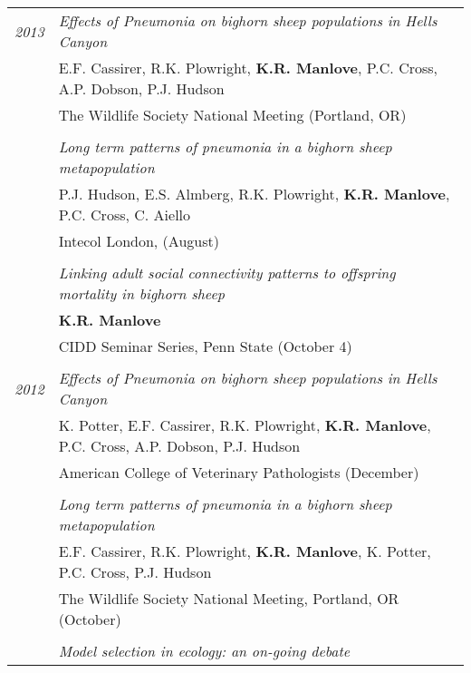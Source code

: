 \documentclass[9pt]{article}
\begin{document}
\vspace{.15in}

\begin{tabular}{p{.5cm} p{15cm}}
\hspace{-1.75cm} \footnotesize{\textit{2013}} & \hspace{-.5cm}\textit{Effects of Pneumonia on bighorn sheep populations in Hells Canyon} \\
& E.F. Cassirer, R.K. Plowright, \textbf{K.R. Manlove}, P.C. Cross, A.P. Dobson, P.J. Hudson \\
& The Wildlife Society National Meeting (Portland, OR)\\
\\
& \hspace{-.5cm}\textit{Long term patterns  of pneumonia in a bighorn sheep metapopulation}\\
& P.J. Hudson, E.S. Almberg, R.K. Plowright, \textbf{K.R. Manlove}, P.C. Cross, C. Aiello\\
& Intecol London, (August) \\
\\
& \hspace{-.5cm}\textit{Linking adult social connectivity patterns to offspring mortality in bighorn sheep}\\
& \textbf{K.R. Manlove}\\
& CIDD Seminar Series, Penn State (October 4) \\
\\
\hspace{-1.75cm} \footnotesize{\textit{2012}} & \hspace{-.5cm}\textit{Effects of Pneumonia on bighorn sheep populations in Hells Canyon} \\
& K. Potter, E.F. Cassirer, R.K. Plowright, \textbf{K.R. Manlove}, P.C. Cross, A.P. Dobson, P.J. Hudson \\
& American College of Veterinary Pathologists (December)\\
\\
& \hspace{-.5cm}\textit{Long term patterns  of pneumonia in a bighorn sheep metapopulation}\\
& E.F. Cassirer, R.K. Plowright, \textbf{K.R. Manlove}, K. Potter, P.C. Cross, P.J. Hudson\\
& The Wildlife Society National Meeting, Portland, OR (October) \\
\\
& \hspace{-.5cm}\textit{Model selection in ecology: an on-going debate }\\

\end{tabular}
\end{document}
